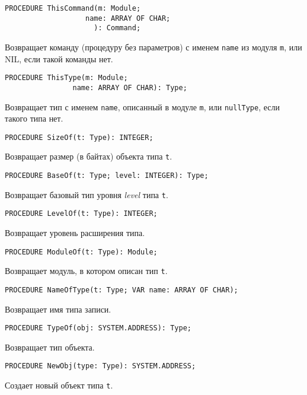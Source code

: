 \begin{verbatim}
PROCEDURE ThisCommand(m: Module;
                   name: ARRAY OF CHAR;
                     ): Command;
\end{verbatim}
Возвращает команду (процедуру без параметров) с именем {\tt name}
из модуля {\tt m}, или NIL, если такой команды нет.

\begin{verbatim}
PROCEDURE ThisType(m: Module;
                name: ARRAY OF CHAR): Type;
\end{verbatim}
Возвращает тип с именем {\tt name}, описанный в модуле
{\tt m}, или {\tt nullType}, если такого типа нет.

\begin{verbatim}
PROCEDURE SizeOf(t: Type): INTEGER;
\end{verbatim}
Возвращает размер (в байтах) объекта типа {\tt t}.

\begin{verbatim}
PROCEDURE BaseOf(t: Type; level: INTEGER): Type;
\end{verbatim}
Возвращает базовый тип уровня {\em level} типа {\tt t}.

\begin{verbatim}
PROCEDURE LevelOf(t: Type): INTEGER;
\end{verbatim}
Возвращает уровень расширения типа.

\begin{verbatim}
PROCEDURE ModuleOf(t: Type): Module;
\end{verbatim}
Возвращает модуль, в котором описан тип {\tt t}.

\begin{verbatim}
PROCEDURE NameOfType(t: Type; VAR name: ARRAY OF CHAR);
\end{verbatim}
Возвращает имя типа  записи.

\begin{verbatim}
PROCEDURE TypeOf(obj: SYSTEM.ADDRESS): Type;
\end{verbatim}
Возвращает тип объекта.

\begin{verbatim}
PROCEDURE NewObj(type: Type): SYSTEM.ADDRESS;
\end{verbatim}
Создает новый объект типа {\tt t}.

